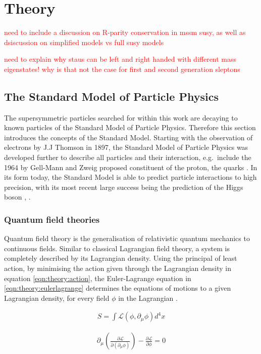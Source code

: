 \chapter{Theory}
\textcolor{red}{need to include a discussion on R-parity conservation in mssm susy, as well as dsiscussion on simplified models vs full susy models}
\graphicspath{{./figures/theory/}}
\label{chap:theory}

\textcolor{red}{need to explain why staus can be left and right handed with different mass eigenstates! why is that not the case for first and second generation sleptons}
\section{The Standard Model of Particle Physics}
The supersymmetric particles searched for within this work are decaying to known particles of the Standard Model of Particle Physics. Therefore this section introduces the concepts of the Standard Model.
Starting with the observation of electrons by J.J Thomson in 1897, the Standard Model of Particle Physics was developed further to describe all particles and their interaction, e.g.~include the 1964 by Gell-Mann and Zweig proposed constituent of the proton, the quarks \cite{Griffiths}. In its form today, the Standard Model is able to predict particle interactions to high precision, with its most recent large success being the prediction of the Higgs boson \cite{ATLASHiggsDiscovery}, \cite{CMSHiggsDiscovery}.
\subsection{Quantum field theories}
Quantum field theory is the generalisation of relativistic quantum mechanics to continuous fields. Similar to classical Lagrangian field theory, a system is completely described by its Lagrangian density. Using the principal of least action, by minimising the action given through the Lagrangian density in equation \ref{eqn:theory:action}, the Euler-Lagrange equation in \ref{eqn:theory:eulerlagrange} determines the equations of motions to a given Lagrangian density, for every field $\phi$ in the Lagrangian \cite{Peskin}. 

\begin{align}
S = \int \mathcal{L}(\phi, \partial_\mu \phi) d^4x \label{eqn:theory:action}
\end{align}

\begin{align}
\partial_\mu \left( \frac{\partial \mathcal{L} }{\partial ( \partial_\mu \phi )} \right) - \frac{\partial \mathcal{L}}{\partial \phi} = 0 \label{eqn:theory:eulerlagrange}
\end{align}

